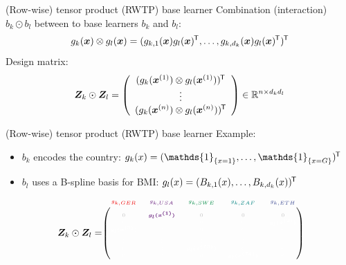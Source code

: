 \documentclass[t,10pt]{beamer}
\begin{document}
\begin{frame}{(Row-wise) tensor product (RWTP) base learner}
  Combination (interaction) $b_k \odot b_l$ between to base learners $b_k$ and $b_l$:
  \[g_k(\xv) \otimes g_l(\xv) = (g_{k,1}(\xv)g_l(\xv)^\tran, \dots, g_{k,d_k}(\xv)g_l(\xv)^\tran)^\tran \]
  Design matrix:
  \[
  \design_k \odot \design_l = \left(\begin{array}{c}
    (g_{k}(\xi[1]) \otimes g_l(\xi[1]))^\tran \\
    \vdots \\
    (g_{k}(\xi[n]) \otimes g_l(\xi[n]))^\tran
  \end{array}\right) \in\R^{n\times d_k d_l}
  \]
\end{frame}





\begin{frame}{(Row-wise) tensor product (RWTP) base learner}
  Example:
  \begin{itemize}
    \item $b_k$ encodes the country: $g_k(x) = (\mathds{1}_{\{x = 1\}}, \dots, \mathds{1}_{\{x = G\}})^\tran$
    \item $b_l$ uses a B-spline basis for BMI: $g_l(x) = (B_{k,1}(x), \dots, B_{k,d_k}(x))^\tran$
  \end{itemize}
  $$
    \design_k \odot \design_l = \tiny\begin{blockarray}{ccccc}
      \color[HTML]{EE0000}g_{k,GER} & \color[HTML]{631879}g_{k,USA} & \color[HTML]{008B45}g_{k,SWE} & \color[HTML]{008280}g_{k,ZAF} & \color[HTML]{3B4992}g_{k,ETH}\\
    \begin{block}{(ccccc)}
      \phantom{x}\\
      \color{lightgray}0 & \color[HTML]{631879}\bm{g_l(x^{(1)})} & \color{lightgray}0 & \color{lightgray}0 & \color{lightgray}0 \\
      \color{white}0 & \color{white}0 & \color{white}0 & \color{white}0 & \color{white}\bm{g_l(x^{(2)})} \\
      \color{white}\bm{g_l(x^{(3)})} & \color{white}0 & \color{white}0 & \color{white}0 & \color{white}0 \\
      \color{white}\vdots & \color{white}\vdots & \color{white}\vdots & \color{white}\vdots & \color{white}\vdots \\
      \color{white}0 & \color{white}0 & \color{white}\bm{g_l(x^{(73)})} & \color{white}0 & \color{white}0 \\
      \color{white}0 & \color{white}0 & \color{white}0 & \color{white}\bm{g_l(x^{(74)})} & \color{white}0 \\

\end{block}
\end{blockarray}$$
\end{frame}
\end{document}
